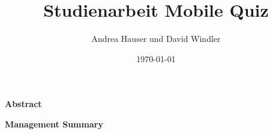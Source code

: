 \documentclass[12pt, a4paper]{report}
\date{\today}
\title{Studienarbeit Mobile Quiz}
\author{Andrea Hauser und David Windler}
\begin{document}
	
	\listoftodos
	
	\begin{titlepage}
	
	\end{titlepage}
	
	
	\begin{center}
		{\LARGE \textbf{Abstract}}
	\end{center}
	
	\newpage
	
	
	\bigskip
	
	\newpage
	
	
	
	\newpage
	
	
	
	\newpage
	
	
	{\LARGE \textbf{Management Summary}}
	
	
	
	
	
	
	
	
\end{document}
